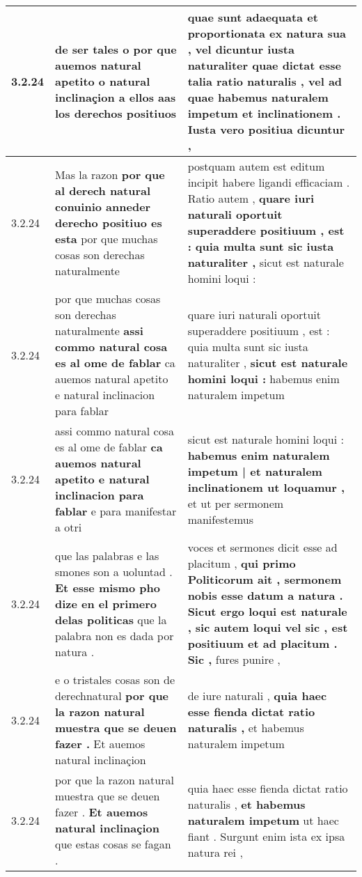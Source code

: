 \begin{tabular}{|p{1cm}|p{6.5cm}|p{6.5cm}|}
3.2.24 & de ser tales \textbf{ o por que auemos natural apetito o natural inclinaçion } a ellos aas los derechos positiuos & quae sunt adaequata et proportionata ex natura sua , vel dicuntur iusta naturaliter quae dictat esse talia ratio naturalis , \textbf{ vel ad quae habemus naturalem impetum et inclinationem . } Iusta vero positiua dicuntur , \\\hline
3.2.24 & Mas la razon \textbf{ por que al derech natural conuinio anneder derecho positiuo es esta } por que muchas cosas son derechas naturalmente & postquam autem est editum incipit habere ligandi efficaciam . Ratio autem , \textbf{ quare iuri naturali oportuit superaddere positiuum , est : quia multa sunt sic iusta naturaliter , } sicut est naturale homini loqui : \\\hline
3.2.24 & por que muchas cosas son derechas naturalmente \textbf{ assi commo natural cosa es al ome de fablar } ca auemos natural apetito e natural inclinacion para fablar & quare iuri naturali oportuit superaddere positiuum , est : quia multa sunt sic iusta naturaliter , \textbf{ sicut est naturale homini loqui : } habemus enim naturalem impetum \\\hline
3.2.24 & assi commo natural cosa es al ome de fablar \textbf{ ca auemos natural apetito e natural inclinacion para fablar } e para manifestar a otri & sicut est naturale homini loqui : \textbf{ habemus enim naturalem impetum | et naturalem inclinationem ut loquamur , } et ut per sermonem manifestemus \\\hline
3.2.24 & que las palabras e las smones son a uoluntad . \textbf{ Et esse mismo pho dize en el primero delas politicas } que la palabra non es dada por natura . & voces et sermones dicit esse ad placitum , \textbf{ qui primo Politicorum ait , sermonem nobis esse datum a natura . Sicut ergo loqui est naturale , sic autem loqui vel sic , est positiuum et ad placitum . Sic , } fures punire , \\\hline
3.2.24 & e o tristales cosas son de derechnatural \textbf{ por que la razon natural muestra que se deuen fazer . } Et auemos natural inclinaçion & de iure naturali , \textbf{ quia haec esse fienda dictat ratio naturalis , } et habemus naturalem impetum \\\hline
3.2.24 & por que la razon natural muestra que se deuen fazer . \textbf{ Et auemos natural inclinaçion } que estas cosas se fagan . & quia haec esse fienda dictat ratio naturalis , \textbf{ et habemus naturalem impetum } ut haec fiant . Surgunt enim ista ex ipsa natura rei , \\\hline

\end{tabular}
